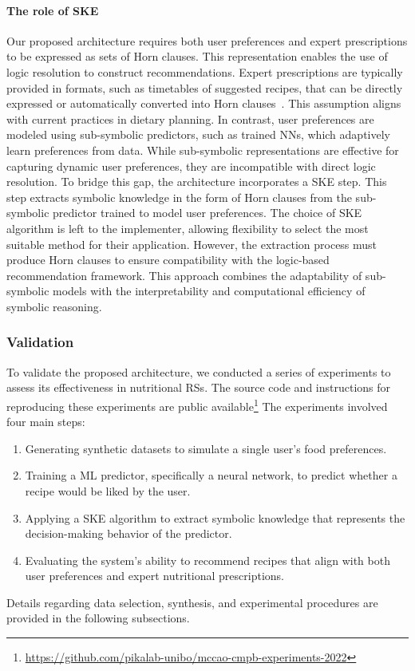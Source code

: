 \paragraph{The role of \gls{SKE}}\label{par:the-role-of-ske}
%
Our proposed architecture requires both user preferences and expert prescriptions to be expressed as sets of Horn clauses.
%
This representation enables the use of logic resolution to construct recommendations.
%
Expert prescriptions are typically provided in formats, such as timetables of suggested recipes, that can be directly expressed or automatically converted into Horn clauses~\cite{DBLP:journals/jcss/Makowsky87}.
%
This assumption aligns with current practices in dietary planning.
%
In contrast, user preferences are modeled using sub-symbolic predictors, such as trained \glspl{NN}, which adaptively learn preferences from data.
%
While sub-symbolic representations are effective for capturing dynamic user preferences, they are incompatible with direct logic resolution.
%
To bridge this gap, the architecture incorporates a \gls{SKE} step.
%
This step extracts symbolic knowledge in the form of Horn clauses from the sub-symbolic predictor trained to model user preferences.
%
The choice of \gls{SKE} algorithm is left to the implementer, allowing flexibility to select the most suitable method for their application.
%
However, the extraction process must produce Horn clauses to ensure compatibility with the logic-based recommendation framework.
%
This approach combines the adaptability of sub-symbolic models with the interpretability and computational efficiency of symbolic reasoning.


\subsubsection{Validation}\label{subsubsec:validation-ske-nutrition}
%
To validate the proposed architecture, we conducted a series of experiments to assess its effectiveness in nutritional \glspl{RS}.
%
The source code and instructions for reproducing these experiments are public available\footnote{\url{https://github.com/pikalab-unibo/mccao-cmpb-experiments-2022}}
%
The experiments involved four main steps:
%
\begin{enumerate}
  \item Generating synthetic datasets to simulate a single user's food preferences.
  \item Training a \gls{ML} predictor, specifically a neural network, to predict whether a recipe would be liked by the user.
  \item Applying a \gls{SKE} algorithm to extract symbolic knowledge that represents the decision-making behavior of the predictor.
  \item Evaluating the system's ability to recommend recipes that align with both user preferences and expert nutritional prescriptions.
\end{enumerate}
%
Details regarding data selection, synthesis, and experimental procedures are provided in the following subsections.

